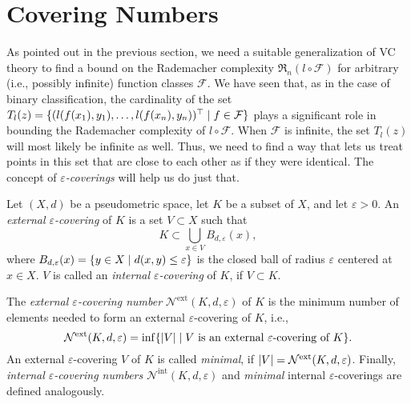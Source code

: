 \section{Covering Numbers}

As pointed out in the previous section, we need a suitable generalization of VC theory to find a bound on the Rademacher complexity $\mathfrak{R}_n(l \circ \mathcal{F})$ for arbitrary (i.e., possibly infinite) function classes $\mathcal{F}$. We have seen that, as in the case of binary classification, the cardinality of the set $T_l(z) = \{(l(f(x_1), y_1), \dots, l(f(x_n), y_n))^{\top} \mathrel{|} f \in \mathcal{F}\}$ plays a significant role in bounding the Rademacher complexity of $l \circ \mathcal{F}$. When $\mathcal{F}$ is infinite, the set $T_l(z)$ will  most likely be infinite as well. Thus, we need to find a way that lets us treat points in this set that are close to each other as if they were identical. The concept of \emph{$\varepsilon$-coverings} will help us do just that.

\begin{definition}
Let $(X, d)$ be a pseudometric space, let $K$ be a subset of $X$, and let $\varepsilon > 0$. An \emph{external $\varepsilon$-covering} of $K$ is a set $V \subset X$ such that
\[
    K \subset \bigcup_{x \in V} B_{d, \varepsilon}(x),
\]
where $B_{d, \varepsilon}(x) = \set{y \in X \with d(x, y) \leq \varepsilon}$ is the closed ball of radius $\varepsilon$ centered at $x \in X$. $V$ is called an \emph{internal $\varepsilon$-covering} of $K$, if $V \subset K$.

The \emph{external $\varepsilon$-covering number} $\mathcal{N}^{\text{ext}}(K, d, \varepsilon)$ of $K$ is the minimum number of elements needed to form an external $\varepsilon$-covering of $K$, i.e.,
\[
    \mathcal{N}^{\text{ext}}(K, d, \varepsilon) = \inf\set{\abs{V} \with V \text{ is an external } \varepsilon \text{-covering of } K}.
\]
An external $\varepsilon$-covering $V$ of $K$ is called \emph{minimal}, if $\abs{V} = \mathcal{N}^{\text{ext}}(K, d, \varepsilon)$. Finally, \emph{internal $\varepsilon$-covering numbers} $\mathcal{N}^{\text{int}}(K, d, \varepsilon)$ and \emph{minimal} internal $\varepsilon$-coverings are defined analogously.
\end{definition}

